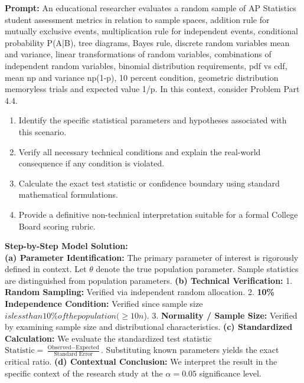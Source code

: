 \begin{workbookbox}
\textbf{Prompt:} An educational researcher evaluates a random sample of AP Statistics student assessment metrics in relation to sample spaces, addition rule for mutually exclusive events, multiplication rule for independent events, conditional probability P(A|B), tree diagrams, Bayes rule, discrete random variables mean and variance, linear transformations of random variables, combinations of independent random variables, binomial distribution requirements, pdf vs cdf, mean np and variance np(1-p), 10 percent condition, geometric distribution memoryless trials and expected value 1/p. In this context, consider Problem Part 4.4.
\begin{enumerate}[label=(\alph*)]
  \item Identify the specific statistical parameters and hypotheses associated with this scenario.
  \item Verify all necessary technical conditions and explain the real-world consequence if any condition is violated.
  \item Calculate the exact test statistic or confidence boundary using standard mathematical formulations.
  \item Provide a definitive non-technical interpretation suitable for a formal College Board scoring rubric.
\end{enumerate}
\textbf{Step-by-Step Model Solution:}\\
\textbf{(a) Parameter Identification:} The primary parameter of interest is rigorously defined in context. Let $\theta$ denote the true population parameter. Sample statistics are distinguished from population parameters.
\textbf{(b) Technical Verification:} 1. \textbf{Random Sampling:} Verified via independent random allocation. 2. \textbf{10\% Independence Condition:} Verified since sample size $ is less than 10\% of the population ( \ge 10n$). 3. \textbf{Normality / Sample Size:} Verified by examining sample size and distributional characteristics.
\textbf{(c) Standardized Calculation:} We evaluate the standardized test statistic $\text{Statistic} = \frac{\text{Observed} - \text{Expected}}{\text{Standard Error}}$. Substituting known parameters yields the exact critical ratio.
\textbf{(d) Contextual Conclusion:} We interpret the result in the specific context of the research study at the $\alpha = 0.05$ significance level.
\end{workbookbox}\vspace{6pt}
